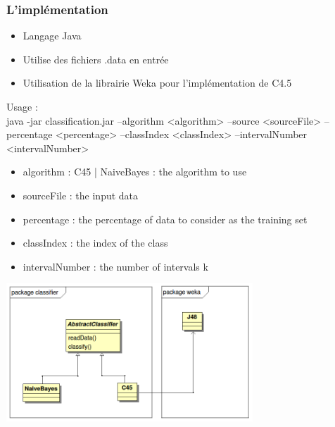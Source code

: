 \begin{frame}
 \frametitle{L'implémentation}

\begin{itemize}
 \item Langage Java
 \item Utilise des fichiers .data en entrée
 \item Utilisation de la librairie Weka pour l'implémentation de C4.5
\end{itemize}
Usage : \\
java -jar classification.jar --algorithm <algorithm> --source <sourceFile> --percentage <percentage> --classIndex <classIndex> --intervalNumber <intervalNumber>
  \begin{itemize}
    \item algorithm : C45 | NaiveBayes : the algorithm to use 
    \item sourceFile : the input data
    \item percentage : the percentage of data to consider as the training set
    \item classIndex : the index of the class
	\item intervalNumber : the number of intervals k
  \end{itemize}
\end{frame}

 \begin{frame}[plain]
\begin{agrandirmarges}{1cm}{1cm}
 \begin{center}

\includegraphics[width=350px]{classDiagram.png}
\end{center}

\end{agrandirmarges}


\end{frame}
 